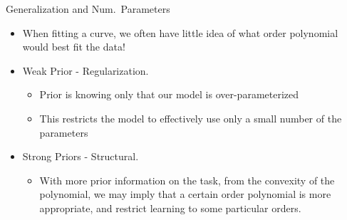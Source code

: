 \documentclass[t,xcolor=dvipsnames]{beamer}
\begin{document}
\begin{frame}{Generalization and Num.\ Parameters}
\begin{itemize}
	\item When fitting a curve, we often have little idea of what order polynomial would best fit the data!
	\item Weak Prior - Regularization.
	\begin{itemize}
	    \item Prior is knowing only that our model is over-parameterized
	    \item This restricts the model to effectively use only a small number of the parameters
	\end{itemize}
	\item Strong Priors - Structural.
	\begin{itemize}
	    \item With more prior information on the task, \eg from the convexity of the polynomial, we may imply that a certain order polynomial is more appropriate, and restrict learning to some particular orders. %
	\end{itemize}
\end{itemize}
\end{frame}
\end{document}
